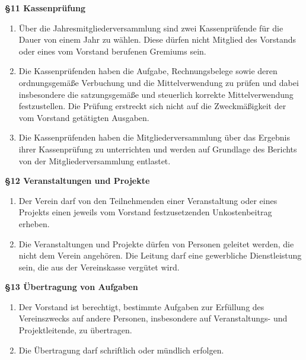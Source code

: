 \documentclass[a4paper,
               12pt,
               titlepage,
               parskip=half]{scrartcl}
\begin{document}
\vspace{1.0em}

\textbf{§11 Kassenprüfung}
{\small
	\begin{enumerate}
		\item Über die Jahresmitgliederversammlung sind zwei Kassenprüfende für die Dauer von einem Jahr zu wählen. Diese dürfen nicht Mitglied des Vorstands oder eines vom Vorstand berufenen Gremiums sein.
		\item Die Kassenprüfenden haben die Aufgabe, Rechnungsbelege sowie deren ordnungsgemäße Verbuchung und die Mittelverwendung zu prüfen und dabei insbesondere die satzungsgemäße und steuerlich korrekte Mittelverwendung festzustellen. Die Prüfung erstreckt sich nicht auf die Zweckmäßigkeit der vom Vorstand getätigten Ausgaben.
		\item Die Kassenprüfenden haben die Mitgliederversammlung über das Ergebnis ihrer Kassenprüfung zu unterrichten und werden auf Grundlage des Berichts von der Mitgliederversammlung entlastet.
	\end{enumerate}
}

\vspace{1.0em}

\textbf{§12 Veranstaltungen und Projekte}
{\small
	\begin{enumerate}
		\item Der Verein darf von den Teilnehmenden einer Veranstaltung oder eines Projekts einen jeweils vom Vorstand festzusetzenden Unkostenbeitrag erheben.
		\item Die Veranstaltungen und Projekte dürfen von Personen geleitet werden, die nicht dem Verein angehören. Die Leitung darf eine gewerbliche Dienstleistung sein, die aus der Vereinskasse vergütet wird.
	\end{enumerate}
}

\vspace{1.0em}

\textbf{§13 Übertragung von Aufgaben}
{\small
	\begin{enumerate}
		\item Der Vorstand ist berechtigt, bestimmte Aufgaben zur Erfüllung des Vereinszwecks auf
		andere Personen, insbesondere auf Veranstaltungs- und Projektleitende, zu übertragen.
		\item Die Übertragung darf schriftlich oder mündlich erfolgen.
	\end{enumerate}
}

\vspace{1.0em}
\end{document}
